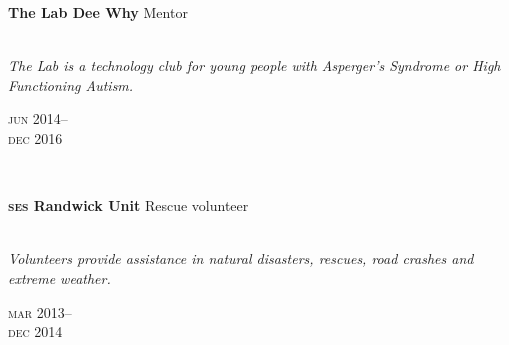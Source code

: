 
\begin{minipage}[t]{\mainboxwidth\textwidth}
\textbf{The Lab Dee Why}\phantom{..} Mentor \\
\\
{\small
\textit{The Lab is a technology club for young people with Asperger’s Syndrome or High Functioning Autism.}
\par}
\end{minipage}
\begin{minipage}[t]{\detailboxwidth\textwidth}
{
\hfill \textsc{jun} 2014--\\ 
\hspace*{0pt} \hfill \textsc{dec} 2016
\par
}
\end{minipage}
\\


\begin{minipage}[t]{\mainboxwidth\textwidth}
\textbf{\textsc{ses} Randwick Unit}\phantom{..} Rescue volunteer\\
\\
{\small
\textit{Volunteers provide assistance in natural disasters, rescues, road crashes and extreme weather.}
\par}
\end{minipage}
\begin{minipage}[t]{\detailboxwidth\textwidth}
{
\hfill \textsc{mar} 2013--\\ 
\hspace*{0pt} \hfill \textsc{dec} 2014
\par
}
\end{minipage}
\\


